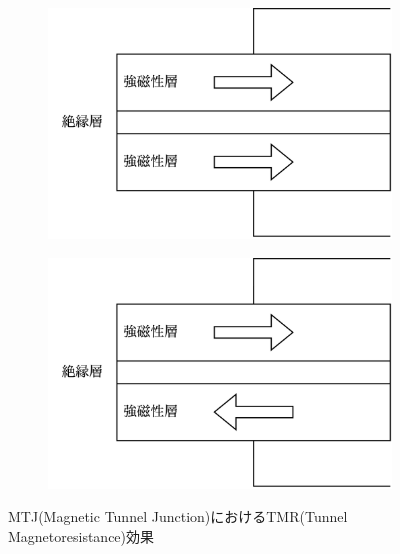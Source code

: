 \begin{figure}
    \centering
    \begin{subfigure}{0.48\linewidth}
        \centering
        \includegraphics[width=0.8\linewidth]{src/figures/pri-tmr/tmr-p.png}
        \label{subfig:tmr-p}
    \end{subfigure}
    \begin{subfigure}{0.48\linewidth}
        \centering
        \includegraphics[width=0.8\linewidth]{src/figures/pri-tmr/tmr-ap.png}
        \label{subfig:tmr-ap}
    \end{subfigure}
    \caption{MTJ(Magnetic Tunnel Junction)におけるTMR(Tunnel Magnetoresistance)効果}\label{fig:pri-tmr}
\end{figure}
